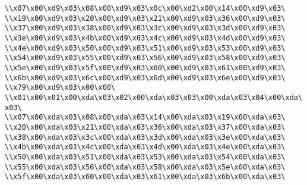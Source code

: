 \verb|\\x07\x00\xd9\x03\x08\x00\xd9\x03\x0c\x00\xd2\x00\x14\x00\xd9\x03\|\newline
\verb|\\x19\x00\xd9\x03\x20\x00\xd9\x03\x21\x00\xd9\x03\x36\x00\xd9\x03\|\newline
\verb|\\x37\x00\xd9\x03\x38\x00\xd9\x03\x3c\x00\xd9\x03\x3d\x00\xd9\x03\|\newline
\verb|\\x3e\x00\xd9\x03\x4b\x00\xd9\x03\x4c\x00\xd9\x03\x4d\x00\xd9\x03\|\newline
\verb|\\x4e\x00\xd9\x03\x50\x00\xd9\x03\x51\x00\xd9\x03\x53\x00\xd9\x03\|\newline
\verb|\\x54\x00\xd9\x03\x55\x00\xd9\x03\x56\x00\xd9\x03\x58\x00\xd9\x03\|\newline
\verb|\\x5e\x00\xd9\x03\x5f\x00\xd9\x03\x60\x00\xd9\x03\x61\x00\xd9\x03\|\newline
\verb|\\x6b\x00\xd9\x03\x6c\x00\xd9\x03\x6d\x00\xd9\x03\x6e\x00\xd9\x03\|\newline
\verb|\\x79\x00\xd9\x03\x00\x00\|\newline
\verb|\\x01\x00\x01\x00\xda\x03\x02\x00\xda\x03\x03\x00\xda\x03\x04\x00\xda\x03\|\newline
\verb|\\x07\x00\xda\x03\x08\x00\xda\x03\x14\x00\xda\x03\x19\x00\xda\x03\|\newline
\verb|\\x20\x00\xda\x03\x21\x00\xda\x03\x36\x00\xda\x03\x37\x00\xda\x03\|\newline
\verb|\\x38\x00\xda\x03\x3c\x00\xda\x03\x3d\x00\xda\x03\x3e\x00\xda\x03\|\newline
\verb|\\x4b\x00\xda\x03\x4c\x00\xda\x03\x4d\x00\xda\x03\x4e\x00\xda\x03\|\newline
\verb|\\x50\x00\xda\x03\x51\x00\xda\x03\x53\x00\xda\x03\x54\x00\xda\x03\|\newline
\verb|\\x55\x00\xda\x03\x56\x00\xda\x03\x58\x00\xda\x03\x5e\x00\xda\x03\|\newline
\verb|\\x5f\x00\xda\x03\x60\x00\xda\x03\x61\x00\xda\x03\x6b\x00\xda\x03\|\newline
